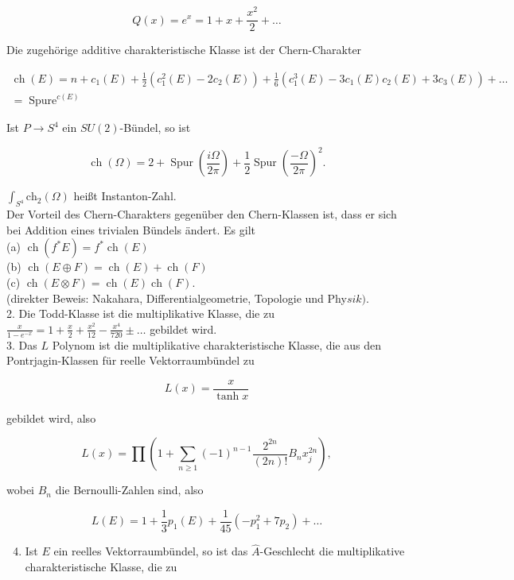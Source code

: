 \documentclass[10pt, letterpaper]{article}
\begin{document}
$$
Q(x)=e^{x}=1+x+\frac{x^{2}}{2}+\ldots
$$

Die zugehörige additive charakteristische Klasse ist der Chern-Charakter

$$
\begin{gathered}
\operatorname{ch}(E)=n+c_{1}(E)+\frac{1}{2}\left(c_{1}^{2}(E)-2 c_{2}(E)\right)+\frac{1}{6}\left(c_{1}^{3}(E)-3 c_{1}(E) c_{2}(E)+3 c_{3}(E)\right)+\ldots \\
=\operatorname{Spure}^{c(E)}
\end{gathered}
$$

Ist $P \rightarrow S^{4}$ ein $S U(2)$-Bündel, so ist

$$
\operatorname{ch}(\Omega)=2+\operatorname{Spur}\left(\frac{i \Omega}{2 \pi}\right)+\frac{1}{2} \operatorname{Spur}\left(\frac{-\Omega}{2 \pi}\right)^{2} .
$$

$\int_{S^{4}} \mathrm{ch}_{2}(\Omega)$ heißt Instanton-Zahl.\\
Der Vorteil des Chern-Charakters gegenüber den Chern-Klassen ist, dass er sich bei Addition eines trivialen Bündels ändert. Es gilt\\
(a) $\operatorname{ch}\left(f^{*} E\right)=f^{*} \operatorname{ch}(E)$\\
(b) $\operatorname{ch}(E \oplus F)=\operatorname{ch}(E)+\operatorname{ch}(F)$\\
(c) $\operatorname{ch}(E \otimes F)=\operatorname{ch}(E) \operatorname{ch}(F)$.\\
(direkter Beweis: Nakahara, Differentialgeometrie, Topologie und Phy$s i k)$.\\
2. Die Todd-Klasse ist die multiplikative Klasse, die zu $\frac{x}{1-e^{-x}}=1+\frac{x}{2}+ \frac{x^{2}}{12}-\frac{x^{4}}{720} \pm \ldots$ gebildet wird.\\
3. Das $L$ Polynom ist die multiplikative charakteristische Klasse, die aus den Pontrjagin-Klassen für reelle Vektorraumbündel zu

$$
L(x)=\frac{x}{\tanh x}
$$

gebildet wird, also

$$
L(x)=\prod\left(1+\sum_{n \geq 1}(-1)^{n-1} \frac{2^{2 n}}{(2 n)!} B_{n} x_{j}^{2 n}\right),
$$

wobei $B_{n}$ die Bernoulli-Zahlen sind, also

$$
L(E)=1+\frac{1}{3} p_{1}(E)+\frac{1}{45}\left(-p_{1}^{2}+7 p_{2}\right)+\ldots
$$

\begin{enumerate}
  \setcounter{enumi}{3}
  \item Ist $E$ ein reelles Vektorraumbündel, so ist das $\hat{A}$-Geschlecht die multiplikative charakteristische Klasse, die zu
\end{enumerate}
\end{document}
